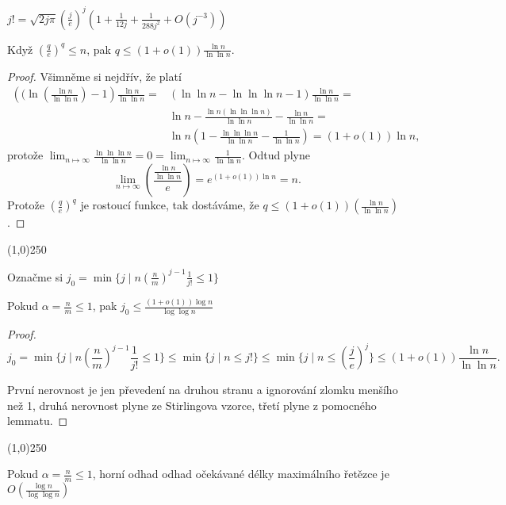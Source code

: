 \documentclass[a4paper,12pt]{article}
\newenvironment{myproof}{
  \begin{proof}
    
  }{
  \end{proof}
  \begin{center}
   \line(1,0){250}
   \end{center}
  }
\begin{document}
\begin{lemma}
    $j!=\sqrt{2j\pi}\left(\frac je\right)^j\left(1+\frac 1{12j}+\frac 1{288j^2}+O(j^{-3})\right)$
\end{lemma}

\begin{lemma}
    Když $(\frac qe)^q\le n$, pak $q\le(1+o(1))\frac{\ln n}{\ln\ln n}$.
\end{lemma}

\begin{myproof}Všimněme si nejdřív, že platí
\begin{align*}\left((\ln(\frac{\ln n}{\ln\ln n})-1\right)\frac{\ln n}{\ln\ln n}=&(\ln\ln n-\ln\ln\ln n-1)\frac{\ln n}{\ln\ln n}=\\&
\ln n-\frac{\ln n(\ln\ln\ln n)}{\ln\ln n}-\frac{\ln n}{\ln\ln n}=\\&\ln n(1-\frac{\ln\ln\ln n}{\ln\ln n}-
\frac 1{\ln\ln n})=(1+o(1))\ln n,\end{align*}
protože $\lim_{n\mapsto\infty}\frac{\ln\ln\ln n}{\ln\ln n}=0=\lim_{n\mapsto\infty}\frac 1{\ln\ln n}$. 
Odtud plyne $$\lim_{n\mapsto\infty}\left(\frac{\frac{\ln n}{\ln\ln n}}e\right)=e^{(1+o(1))\ln n}=n.$$ Protože $(\frac qe)^q$ je rostoucí funkce, tak dostáváme, že $q\le(1+o(1))(\frac{\ln n}{\ln\ln n})$.
\end{myproof}

Označme si $j_0 = \min\{j\mid n(\frac nm)^{j-1}\frac 1{j!}\le 1\}$

\begin{lemma}[Omezení $j_0$]
    Pokud  $\alpha =\frac nm\le 1$, pak $j_0\le\frac {(1+o(1))\log n}{\log\log n}$
\end{lemma}

\begin{myproof}
    $$j_0=\min\{j\mid n(\frac nm)^{j-1}\frac 1{j!}\le 1\}\le\min\{j\mid n\le j!\}\le\min\{j\mid n\le
    (\frac je)^j\}\le(1+o(1))\frac{\ln n}{\ln\ln n}.$$
    
    První nerovnost je jen převedení na druhou stranu a ignorování zlomku menšího než 1, druhá nerovnost plyne ze Stirlingova vzorce, třetí plyne z pomocného lemmatu.
\end{myproof}

\begin{veta}
    Pokud  $\alpha =\frac nm\le 1$, horní odhad odhad očekávané délky 
    maximálního ře\-těz\-ce je $O(\frac {\log n}{\log\log n})$
\end{veta}
 
\end{document}
